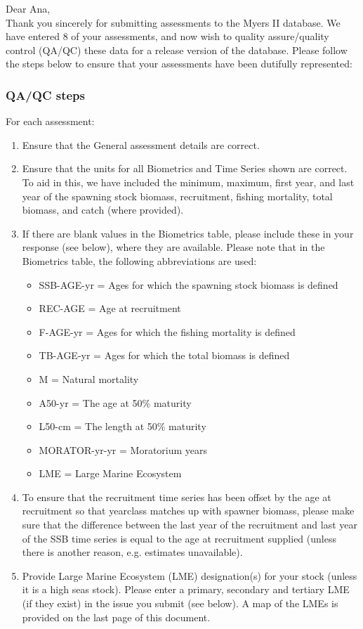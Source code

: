 \documentclass [a4paper, 10pt] {article}
\begin{document}
\noindent Dear Ana,\\

\noindent Thank you sincerely for submitting assessments to the Myers II database. We have entered 8 of your assessments, and now wish to quality assure/quality control (QA/QC) these data for a release version of the database. Please follow the steps below to ensure that your assessments have been dutifully represented:
\subsubsection{QA/QC steps}
For each assessment:
\begin{enumerate}
\item Ensure that the General assessment details are correct.
\item Ensure that the units for all Biometrics and Time Series shown are correct. To aid in this, we have included the minimum, maximum, first year, and last year of the spawning stock biomass, recruitment, fishing mortality, total biomass, and  catch  (where provided). 
\item If there are blank values in the Biometrics table, please include these in your response (see below), where they are available.
Please note that in the Biometrics table, the following abbreviations are used:
\begin{itemize}
\item SSB-AGE-yr  = Ages for which the spawning stock biomass is defined
\item REC-AGE     = Age at recruitment
\item F-AGE-yr    = Ages for which the fishing mortality is defined 
\item TB-AGE-yr   = Ages for which the total biomass is defined
\item M      = Natural mortality
\item A50-yr      = The age at 50\% maturity
\item L50-cm      = The length at 50\% maturity
\item MORATOR-yr-yr = Moratorium years
\item LME = Large Marine Ecosystem\\
\end{itemize}
\item To ensure that the recruitment time series has been offset by the age at recruitment so that yearclass matches up with spawner biomass, please make sure that the difference between the last year of the recruitment and last year of the SSB time series is equal to the age at recruitment supplied (unless there is another reason, e.g. estimates unavailable). 
\item Provide Large Marine Ecosystem (LME) designation(s) for your stock (unless it is a high seas stock). Please enter a primary, secondary and tertiary LME (if they exist) in the issue you submit (see below). A map of the LMEs is provided on the last page of this document. 
\end{enumerate}
\vspace{-.25in}
\end{document}
